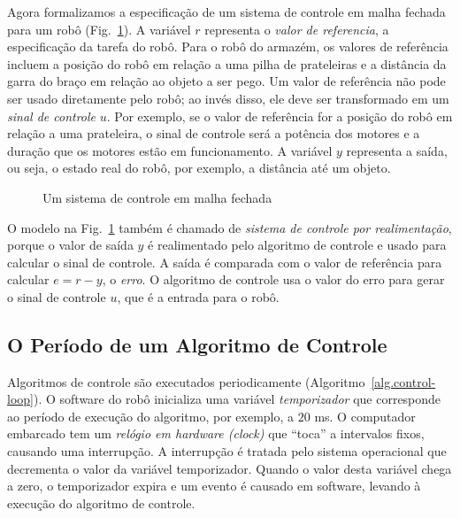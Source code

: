 Agora formalizamos a especificação de um sistema de controle em malha fechada para um robô (Fig.~\ref{fig.control-model}). A variável $r$ representa o \emph{valor de referencia}, a especificação da tarefa do robô. Para o robô do armazém, os valores de referência incluem a posição do robô em relação a uma pilha de prateleiras e a distância da garra do braço em relação ao objeto a ser pego. Um valor de referência não pode ser usado diretamente pelo robô; ao invés disso, ele deve ser transformado em um \emph{sinal de controle} $u$. Por exemplo, se o valor de referência for a posição do robô em relação a uma prateleira, o sinal de controle será a potência dos motores e a duração que os motores estão em funcionamento. A variável $y$ representa a saída, ou seja, o estado real do robô, por exemplo, a distância até um objeto.

\begin{figure}
\begin{center}
\caption{Um sistema de controle em malha fechada}\label{fig.control-model}
\end{center}
\end{figure}

O modelo na Fig.~\ref{fig.control-model} também é chamado de \emph{sistema de controle por realimentação}, porque o valor de saída $y$ é realimentado pelo algoritmo de controle e usado para calcular o sinal de controle. A saída é comparada com o valor de referência para calcular $e=r-y$, o \emph{erro}. O algoritmo de controle usa o valor do erro para gerar o sinal de controle $u$, que é a entrada para o robô.

\subsection{O Período de um Algoritmo de Controle}

Algoritmos de controle são executados periodicamente (Algoritmo~\ref{alg.control-loop}). O software do robô inicializa uma variável \emph{temporizador} que corresponde ao período de execução do algoritmo, por exemplo, a $20$ ms. O computador embarcado tem um \emph{relógio em hardware (clock)} que ``toca'' a intervalos fixos, causando uma interrupção. A interrupção é tratada pelo sistema operacional que decrementa o valor da variável temporizador. Quando o valor desta variável chega a zero, o temporizador expira e um evento é causado em software, levando à execução do algoritmo de controle.

